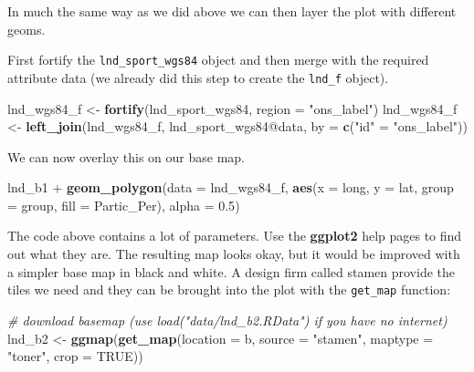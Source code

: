 \documentclass[]{article}
\newenvironment{Shaded}{}{}
\newcommand{\KeywordTok}[1]{\textcolor[rgb]{0.00,0.44,0.13}{\textbf{{#1}}}}
\newcommand{\DataTypeTok}[1]{\textcolor[rgb]{0.56,0.13,0.00}{{#1}}}
\newcommand{\FloatTok}[1]{\textcolor[rgb]{0.25,0.63,0.44}{{#1}}}
\newcommand{\StringTok}[1]{\textcolor[rgb]{0.25,0.44,0.63}{{#1}}}
\newcommand{\CommentTok}[1]{\textcolor[rgb]{0.38,0.63,0.69}{\textit{{#1}}}}
\newcommand{\OtherTok}[1]{\textcolor[rgb]{0.00,0.44,0.13}{{#1}}}
\newcommand{\NormalTok}[1]{{#1}}
\begin{document}
In much the same way as we did above we can then layer the plot with
different geoms.

First fortify the \texttt{lnd\_sport\_wgs84} object and then merge with
the required attribute data (we already did this step to create the
\texttt{lnd\_f} object).

\begin{Shaded}
\begin{Highlighting}[]
\NormalTok{lnd_wgs84_f <-}\StringTok{ }\KeywordTok{fortify}\NormalTok{(lnd_sport_wgs84, }\DataTypeTok{region =} \StringTok{"ons_label"}\NormalTok{)}
\NormalTok{lnd_wgs84_f <-}\StringTok{ }\KeywordTok{left_join}\NormalTok{(lnd_wgs84_f, lnd_sport_wgs84@data,}
  \DataTypeTok{by =} \KeywordTok{c}\NormalTok{(}\StringTok{"id"} \NormalTok{=}\StringTok{ "ons_label"}\NormalTok{))}
\end{Highlighting}
\end{Shaded}

We can now overlay this on our base map.

\begin{Shaded}
\begin{Highlighting}[]
\NormalTok{lnd_b1 +}
\StringTok{  }\KeywordTok{geom_polygon}\NormalTok{(}\DataTypeTok{data =} \NormalTok{lnd_wgs84_f,}
  \KeywordTok{aes}\NormalTok{(}\DataTypeTok{x =} \NormalTok{long, }\DataTypeTok{y =} \NormalTok{lat, }\DataTypeTok{group =} \NormalTok{group, }\DataTypeTok{fill =} \NormalTok{Partic_Per), }\DataTypeTok{alpha =} \FloatTok{0.5}\NormalTok{)}
\end{Highlighting}
\end{Shaded}

The code above contains a lot of parameters. Use the \textbf{ggplot2}
help pages to find out what they are. The resulting map looks okay, but
it would be improved with a simpler base map in black and white. A
design firm called stamen provide the tiles we need and they can be
brought into the plot with the \texttt{get\_map} function:

\begin{Shaded}
\begin{Highlighting}[]
\CommentTok{# download basemap (use load("data/lnd_b2.RData") if you have no internet)}
\NormalTok{lnd_b2 <-}\StringTok{ }\KeywordTok{ggmap}\NormalTok{(}\KeywordTok{get_map}\NormalTok{(}\DataTypeTok{location =} \NormalTok{b, }\DataTypeTok{source =} \StringTok{"stamen"}\NormalTok{,}
          \DataTypeTok{maptype =} \StringTok{"toner"}\NormalTok{, }\DataTypeTok{crop =} \OtherTok{TRUE}\NormalTok{))}
\end{Highlighting}
\end{Shaded}
\end{document}
